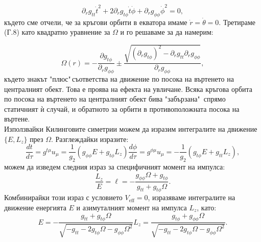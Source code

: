 \begin{appendices}
	\begin{equation}
		\partial_r g_{tt} \dot{t}^2 + 2 \partial_rg_{t\phi}\dot{t}\dot{\phi} + \partial_rg_{\phi\phi}\dot{\phi}^2 = 0,
	\end{equation}
	където сме отчели, че за кръгови орбити в екватора имаме $\dot{r} = \dot{\theta} = 0$. Третираме (Г.8) като квадратно уравнение за $\Omega$ и го решаваме за да намерим:
	
	\begin{equation}
		\Omega(r) = -\frac{\partial g_{t\phi}}{\partial_r g_{\phi\phi}} \pm\frac{\sqrt{\left(\partial_r g_{t\phi}\right)^2 - \partial_rg_{tt}\partial_rg_{\phi\phi}}}{\partial_r g_{\phi\phi}},
	\end{equation}
	където знакът "плюс"$\,$съответства на движение по посока на въртенето на централният обект. Това е проява на ефекта на увличане. Всяка кръгова орбита по посока на въртенето на централният обект бива "забързана"$\,$ спрямо статичният ѝ случай, и обратното за орбити в противоположната посока на въртене. \\
	
	Използвайки Килинговите симетрии можем да изразим интегралите на движение $\{E,L_z\}$ през $\Omega$. Разглеждайки изразите:
	\begin{subequations}
		\begin{equation}
			\frac{dt}{d\tau}=g^{t\mu}u_{\mu}=\frac{1}{g_2}\left(g_{\phi\phi}E+g_{t\phi}L_z\right)
		\end{equation}
		\begin{equation}
			\frac{d\phi}{d\tau}=g^{\phi\mu}u_\mu=-\frac{1}{g_2}\left(g_{t\phi}E+g_{tt}L_z\right),
		\end{equation}
	\end{subequations}
	можем да изведем следния израз за специфичният момент на импулса:
	\begin{equation}
		\frac{L_z}{E}=\ell=-\frac{g_{\phi\phi}\Omega+g_{t\phi}}{g_{tt}+g_{t\phi}\Omega}.
	\end{equation}
	Комбинирайки този израз с условието $V_\text{eff} = 0$, изразяваме интегралите на движение енергията $E$ и азимуталният момент на импулса $L_z$, като:
	\begin{subequations}
		\begin{equation}
			E=-\frac{g_{tt}+g_{t\phi}\Omega}{\sqrt{-g_{tt}-2g_{t\phi}\Omega-g_{\phi\phi}\Omega^2}}
		\end{equation}
		\begin{equation}
			L_z=\frac{g_{t\phi} +g_{\phi\phi}\Omega}{\sqrt{-g_{tt}-2g_{t\phi}\Omega-g_{\phi\phi}\Omega^2}}.
		\end{equation}
	\end{subequations}
	
\end{appendices}
